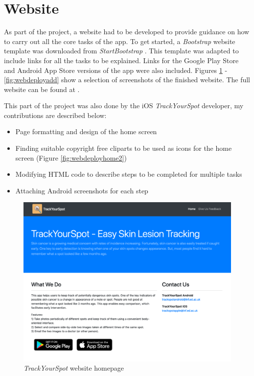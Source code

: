 \section{Website}
As part of the project, a website had to be developed to provide guidance on how to carry out all the core tasks of the app. To get started, a \emph{Bootstrap} website template was downloaded from \emph{StartBootstrap} \cite{bootstrap}. This template was adapted to include links for all the tasks to be explained. Links for the Google Play Store and Android App Store versions of the app were also included. Figures \ref{fig:webdeployhome} - \ref{fig:webdeployadd} show a selection of screenshots of the finished website. The full website can be found at . 

This part of the project was also done by the iOS \emph{TrackYourSpot} developer, my contributions are described below: 
\begin{itemize}
    \item Page formatting and design of the home screen
    \item Finding suitable copyright free cliparts to be used as icons for the home screen (Figure \ref{fig:webdeployhome2}) 
    \item Modifying HTML code to describe steps to be completed for multiple tasks
    \item Attaching Android screenshots for each step
\end{itemize}


\begin{figure}
    \includegraphics[width=1\textwidth, center]{figures/webdeployhome.png}
    \caption{\emph{TrackYourSpot} website homepage}
    \label{fig:webdeployhome}
\end{figure}

